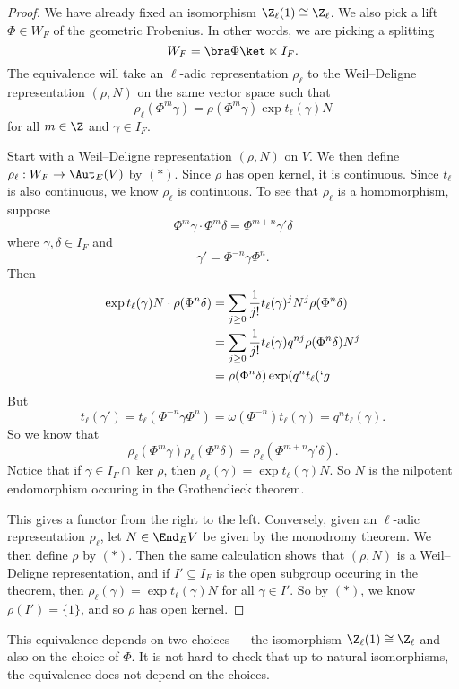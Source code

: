 \documentclass[a4paper]{article}
\begin{document}
\begin{proof}
  We have already fixed an isomorphism $\Z_\ell(1) \cong \Z_\ell$. We also pick a lift $\Phi \in W_F$ of the geometric Frobenius. In other words, we are picking a splitting
  \[
    W_F = \bra \Phi\ket \ltimes I_F.
  \]
  The equivalence will take an $\ell$-adic representation $\rho_\ell$ to the Weil--Deligne representation $(\rho, N)$ on the same vector space such that
  \[
    \rho_\ell(\Phi^m \gamma) = \rho (\Phi^m \gamma) \exp t_\ell(\gamma) N\tag{$*$}
  \]
  for all $m \in \Z$ and $\gamma \in I_F$.

  Start with a Weil--Deligne representation $(\rho, N)$ on $V$. We then define $\rho_\ell: W_F \to \Aut_E(V)$ by $(*)$. Since $\rho$ has open kernel, it is continuous. Since $t_\ell$ is also continuous, we know $\rho_\ell$ is continuous. To see that $\rho_\ell$ is a homomorphism, suppose
  \[
    \Phi^m \gamma \cdot \Phi^m \delta = \Phi^{m + n} \gamma' \delta
  \]
  where $\gamma, \delta \in I_F$ and
  \[
    \gamma' = \Phi^{-n} \gamma \Phi^n.
  \]
  Then
  \begin{align*}
    \exp t_\ell(\gamma) N \cdot \rho(\Phi^n \delta) &= \sum_{j \geq 0} \frac{1}{j!} t_\ell(\gamma)^j N^j \rho(\Phi^n \delta)\\
    &= \sum_{j \geq 0} \frac{1}{j!} t_\ell(\gamma) q^{nj} \rho(\Phi^n \delta) N^j\\
    &= \rho (\Phi^n \delta) \exp (q^n t_\ell(`g
  \end{align*}
  But 
  \[
    t_\ell(\gamma') = t_\ell(\Phi^{-n} \gamma \Phi^n) = \omega(\Phi^{-n}) t_\ell(\gamma) = q^n t_\ell(\gamma).
  \]
  So we know that
  \[
    \rho_\ell(\Phi^m \gamma) \rho_\ell(\Phi^n \delta) = \rho_\ell(\Phi^{m + n} \gamma' \delta).
  \]
  Notice that if $\gamma \in I_F \cap \ker \rho$, then $\rho_\ell(\gamma) = \exp t_\ell(\gamma) N$. So $N$ is the nilpotent endomorphism occuring in the Grothendieck theorem. %

  This gives a functor from the right to the left. Conversely, given an $\ell$-adic representation $\rho_\ell$, let $N \in \End_EV$ be given by the monodromy theorem. We then define $\rho$ by $(*)$. Then the same calculation shows that $(\rho, N)$ is a Weil--Deligne representation, and if $I' \subseteq I_F$ is the open subgroup occuring in the theorem, then $\rho_\ell(\gamma) = \exp t_\ell(\gamma) N$ for all $\gamma \in I'$. So by $(*)$, we know $\rho(I') = \{1\}$, and so $\rho$ has open kernel.
\end{proof}
This equivalence depends on two choices --- the isomorphism $\Z_\ell(1) \cong \Z_\ell$ and also on the choice of $\Phi$. It is not hard to check that up to natural isomorphisms,  the equivalence does not depend on the choices.
\end{document}
